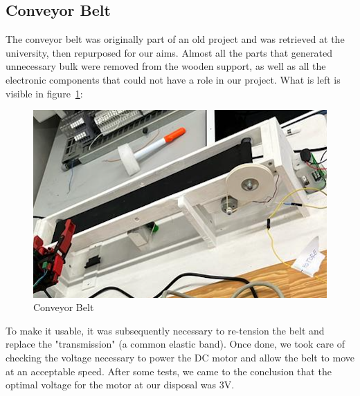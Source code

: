 \documentclass[a4paper,11pt]{report}
\theoremstyle{definition}
\theoremstyle{plain}
\begin{document}
        \subsection{Conveyor Belt}
            The conveyor belt was originally part of an old project and was retrieved at the university, then repurposed for our aims. Almost all the parts that generated unnecessary bulk were removed from the wooden support, as well as all the electronic components that could not have a role in our project. What is left is visible in figure~\ref{nastro}:
            \begin{figure}[H] %
                \includegraphics[scale=0.5]{images/nastro.png}
                \centering
                \caption{Conveyor Belt}
                \label{nastro}
            \end{figure}
            To make it usable, it was subsequently necessary to re-tension the belt and replace the "transmission" (a common elastic band). Once done, we took care of checking the voltage necessary to power the DC motor and allow the belt to move at an acceptable speed. After some tests, we came to the conclusion that the optimal voltage for the motor at our disposal was 3V.
\end{document}
